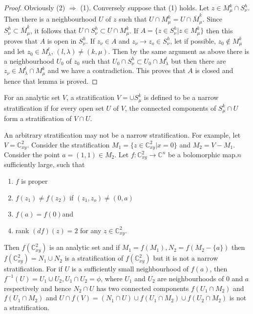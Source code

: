 \begin{proof}
Obviously (2) $\Rightarrow$ (1). Conversely suppose that (1) holds.  
Let $z \in M^{k}_{\mu} \cap S^{h}_{\nu}$. Then there is a
  neighbourhood $U$ of $z$ such that $U \cap M^{k}_{\mu} = U \cap
  \overline{M}^{k}_{\mu}$. Since $S^{h}_{\nu} \subset
  \overline{M}^{k}_{\mu}$, it follows that $U \cap S^{h}_{\nu} \subset
  U \cap M^{k}_{\mu} $. If $A = \{ z \in S^{h}_{\nu}\big| z \in
  M^{k}_{\mu}\}$ then this proves that $A$ is open in
  $S^{h}_{\nu}$. If $z_{\nu} \in A $ and $z_{\nu} \to z_{o} \in
  S^{h}_{\nu}$, let if possible, $z_{0} \notin M^{k}_{\mu}$ and let
  $z_{0} \in M^{l}_{\lambda}$, $(l,\lambda) \neq (k, \mu)$. Then by the
  same argument as above there is a neighbourhood $U_{0}$ of $z_{0}$
  such that $U_{0} \cap S^{h}_{\nu} \subset U_{0} \cap
  M^{l}_{\lambda}$ but then there are $z_{\nu} \in M^{l}_{\lambda}
  \cap M^{k}_{\mu}$ and we have a contradiction. This proves that $A$
  is closed and hence that lemma is proved. 
\end{proof}

\setcounter{definition}{0}
\begin{definition}\label{chap2-defin1} %
 For an analytic set $V$, a stratification $V = \cup S^{k}_{\mu}$ is
  defined to be a narrow stratification if for every open set $U$ of
  $V$, the connected components of $S^{k}_{\mu} \cap U $ form a
  stratification of $V \cap U$.   
\end{definition}

\begin{remark}\label{chap2-rem2} %
  An arbitrary stratification may not be a narrow stratification. For
  example, let $V = \mathbb{C}^{2}_{xy}$. Consider the stratification
  $M_{1} = \big\{ z \in \mathbb{C}^{2}_{xy}\big| x = 0 \big\}$ and
  $M_{2} = V -M_{1}$. Consider the point $ a = (1,1) \in M_{2}$. Let
  $f: \mathbb{C}^{2}_{xy} \to \mathbb{C}^{n}$ be a bolomorphic map.$n$
  sufficiently large, such that  
  \begin{enumerate}[(1)]
  \item $f$ is proper
  \item $f(z_{1}) \neq f(z_{2})$ if $(z_{1},z_{o}) \neq (0,a)$
  \item $f(a) = f(0)$\pageoriginale and 
  \item rank $(df)(z) = 2$ for any $z \in \mathbb{C}^{2}_{xy}$.
  \end{enumerate}    
\end{remark} 

Then $ f(\mathbb{C}^{2}_{xy})$ is an analytic set and if $M_{1} =
f(M_{1}), N_{2} = f(M_{2} - \{a\})$ then $ f(\mathbb{C}^{2}_{xy}) =
N_{1} \cup N_{2}$ is a stratification of $ f( \mathbb{C}^{2}_{xy})$
but it is not a narrow stratification. For if $U$ is a sufficiently
small neighbourhood of $f(a)$, then $f^{-1}(U) = U_{1}\cup U_{2},
U_{1} \cap U_{2} = \phi$, where $U_{1}$ and $U_{2}$ are neighbourhoods
of $0$ and $a$ respectively and hence $N_{2} \cap U$ has two connected
components $f(U_{1}\cap M_{2})$ and $f(U_{1} \cap M_{2})$ and $U \cap
f(V) = (N_{1} \cap U) \cup f (U_{1} \cap M_{2}) \cup f(U_{2}\cap
M_{2})$ is not a stratification.  

